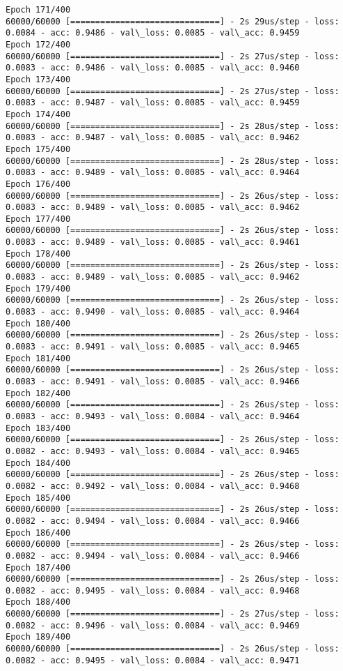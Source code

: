 \documentclass[11pt]{article}
\begin{document}
\begin{Verbatim}[commandchars=\\\{\}]
Epoch 171/400
60000/60000 [==============================] - 2s 29us/step - loss: 0.0084 - acc: 0.9486 - val\_loss: 0.0085 - val\_acc: 0.9459
Epoch 172/400
60000/60000 [==============================] - 2s 27us/step - loss: 0.0083 - acc: 0.9486 - val\_loss: 0.0085 - val\_acc: 0.9460
Epoch 173/400
60000/60000 [==============================] - 2s 27us/step - loss: 0.0083 - acc: 0.9487 - val\_loss: 0.0085 - val\_acc: 0.9459
Epoch 174/400
60000/60000 [==============================] - 2s 28us/step - loss: 0.0083 - acc: 0.9487 - val\_loss: 0.0085 - val\_acc: 0.9462
Epoch 175/400
60000/60000 [==============================] - 2s 28us/step - loss: 0.0083 - acc: 0.9489 - val\_loss: 0.0085 - val\_acc: 0.9464
Epoch 176/400
60000/60000 [==============================] - 2s 26us/step - loss: 0.0083 - acc: 0.9489 - val\_loss: 0.0085 - val\_acc: 0.9462
Epoch 177/400
60000/60000 [==============================] - 2s 26us/step - loss: 0.0083 - acc: 0.9489 - val\_loss: 0.0085 - val\_acc: 0.9461
Epoch 178/400
60000/60000 [==============================] - 2s 26us/step - loss: 0.0083 - acc: 0.9489 - val\_loss: 0.0085 - val\_acc: 0.9462
Epoch 179/400
60000/60000 [==============================] - 2s 26us/step - loss: 0.0083 - acc: 0.9490 - val\_loss: 0.0085 - val\_acc: 0.9464
Epoch 180/400
60000/60000 [==============================] - 2s 26us/step - loss: 0.0083 - acc: 0.9491 - val\_loss: 0.0085 - val\_acc: 0.9465
Epoch 181/400
60000/60000 [==============================] - 2s 26us/step - loss: 0.0083 - acc: 0.9491 - val\_loss: 0.0085 - val\_acc: 0.9466
Epoch 182/400
60000/60000 [==============================] - 2s 26us/step - loss: 0.0083 - acc: 0.9493 - val\_loss: 0.0084 - val\_acc: 0.9464
Epoch 183/400
60000/60000 [==============================] - 2s 26us/step - loss: 0.0082 - acc: 0.9493 - val\_loss: 0.0084 - val\_acc: 0.9465
Epoch 184/400
60000/60000 [==============================] - 2s 26us/step - loss: 0.0082 - acc: 0.9492 - val\_loss: 0.0084 - val\_acc: 0.9468
Epoch 185/400
60000/60000 [==============================] - 2s 26us/step - loss: 0.0082 - acc: 0.9494 - val\_loss: 0.0084 - val\_acc: 0.9466
Epoch 186/400
60000/60000 [==============================] - 2s 26us/step - loss: 0.0082 - acc: 0.9494 - val\_loss: 0.0084 - val\_acc: 0.9466
Epoch 187/400
60000/60000 [==============================] - 2s 26us/step - loss: 0.0082 - acc: 0.9495 - val\_loss: 0.0084 - val\_acc: 0.9468
Epoch 188/400
60000/60000 [==============================] - 2s 27us/step - loss: 0.0082 - acc: 0.9496 - val\_loss: 0.0084 - val\_acc: 0.9469
Epoch 189/400
60000/60000 [==============================] - 2s 26us/step - loss: 0.0082 - acc: 0.9495 - val\_loss: 0.0084 - val\_acc: 0.9471

\end{Verbatim}
\end{document}
